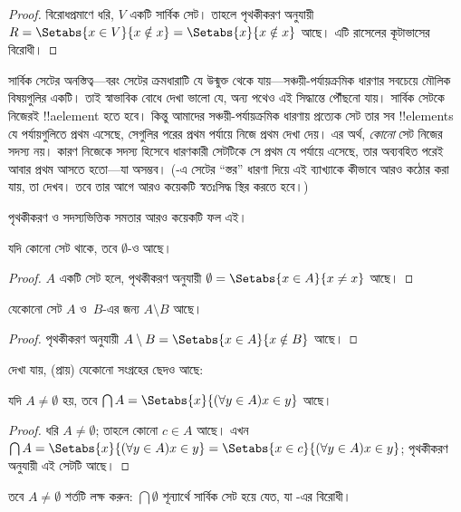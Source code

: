 \documentclass[../../../include/open-logic-section]{subfiles}
\begin{document}
\begin{proof}
বিরোধপ্রমাণে ধরি, $V$ একটি সার্বিক সেট। তাহলে
পৃথকীকরণ অনুযায়ী $R =
\Setabs{x \in V}{x \notin x} = \Setabs{x}{x \notin x}$
আছে। এটি রাসেলের কূটাভাসের বিরোধী।
\end{proof}

সার্বিক সেটের অনস্তিত্ব—বরং সেটের ক্রমধারাটি যে
উন্মুক্ত থেকে যায়—সঞ্চয়ী-পর্যায়ক্রমিক ধারণার
সবচেয়ে মৌলিক বিষয়গুলির একটি। তাই স্বাভাবিক বোধে
দেখা ভালো যে, অন্য পথেও এই সিদ্ধান্তে পৌঁছনো যায়।
সার্বিক সেটকে নিজেরই !!a{element} হতে হবে। কিন্তু
আমাদের সঞ্চয়ী-পর্যায়ক্রমিক ধারণায় প্রত্যেক সেট তার
সব !!{element}s যে পর্যায়গুলিতে প্রথম এসেছে, সেগুলির
পরের প্রথম পর্যায়ে নিজে প্রথম দেখা দেয়। এর অর্থ,
\emph{কোনো} সেট নিজের সদস্য নয়। কারণ নিজেকে সদস্য
হিসেবে ধারণকারী সেটটিকে সে প্রথম যে পর্যায়ে এসেছে,
তার অব্যবহিত পরেই আবার প্রথম আসতে হতো—যা অসম্ভব।
(-এ সেটের
``স্তর'' ধারণা দিয়ে এই ব্যাখ্যাকে কীভাবে আরও কঠোর
করা যায়, তা দেখব। তবে তার আগে আরও কয়েকটি
স্বতঃসিদ্ধ স্থির করতে হবে।)

পৃথকীকরণ ও সদস্যভিত্তিক সমতার আরও কয়েকটি ফল এই।

\begin{prop}
যদি কোনো সেট থাকে, তবে $\emptyset$-ও আছে।
\end{prop}

\begin{proof}
$A$ একটি সেট হলে, পৃথকীকরণ অনুযায়ী
$\emptyset = \Setabs{x \in A}{x \neq x}$ আছে।
\end{proof}

\begin{prop}
যেকোনো সেট $A$ ও~$B$-এর জন্য $A \setminus B$ আছে।
\end{prop}

\begin{proof}
পৃথকীকরণ অনুযায়ী
$A \setminus B = \Setabs{x \in A}{x \notin B}$ আছে।
\end{proof}

দেখা যায়, (প্রায়) যেকোনো সংগ্রহের ছেদও আছে:

\begin{prop}
যদি $A \neq \emptyset$ হয়, তবে
$\bigcap A = \Setabs{x}{(\forall y \in A)x \in y}$ আছে।
\end{prop}

\begin{proof}
ধরি $A \neq \emptyset$; তাহলে কোনো $c \in A$
আছে। এখন $\bigcap A =
\Setabs{x}{(\forall y \in A)x \in y} = \Setabs{x \in c}{(\forall y \in
A)x \in y}$; পৃথকীকরণ অনুযায়ী এই সেটটি আছে।
\end{proof}

তবে $A \neq \emptyset$ শর্তটি লক্ষ করুন:
$\bigcap \emptyset$ শূন্যার্থে সার্বিক সেট হয়ে যেত,
যা -এর বিরোধী।
\end{document}
